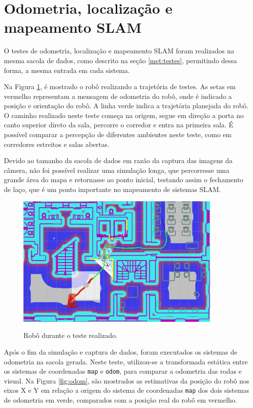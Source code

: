 \documentclass[repeatfields,xlists,xpacks,oneside,yearsonly]{ufrgscca}
\begin{document}
\section{Odometria, localização e mapeamento SLAM}

O testes de odometria, localização e mapeamento SLAM foram realizados na mesma
sacola de dados, como descrito na seção \ref{met:testes}, 
permitindo dessa forma, a mesma entrada em cada sistema.

Na Figura \ref{fig:base_bag}, é mostrado o robô realizando a trajetória
de testes. As setas em vermelho representam a mensagem de odometria do 
robô, onde é indicado a posição e orientação do robô. A linha verde indica 
a trajetória planejada do robô.
O caminho realizado neste teste começa na origem, segue em direção a porta 
no canto superior direto da sala, percorre o corredor e entra na primeira
sala. 
É possível comparar a percepção de diferentes ambientes neste teste, como
em corredores estreitos e salas abertas. 

Devido ao tamanho da sacola de dados em razão da captura das imagens
da câmera, não foi possível realizar uma simulação longa, que percorresse
uma grande área do mapa e retornasse ao ponto inicial, testando assim o 
fechamento de laço, que é um ponto importante no mapeamento de sistemas
SLAM.

\begin{figure}[h]
    {
        \centering
        \caption{Robô durante o teste realizado.}
        \label{fig:base_bag}
        \includegraphics[width=0.9\textwidth]{base_bag_sim_zoom.png}\\
    }
\end{figure}

Após o fim da simulação e captura de dados, foram executados os
sistemas de odometria na sacola gerada.
Neste teste, utilizou-se a transformada estática entre os sistemas
de coordenadas \texttt{map} e \texttt{odom}, para comparar a odometria
das rodas e visual.
Na Figura \ref{fig:odom}, são mostrados as estimativas da posição do robô
nos eixos X e Y em relação a origem do sistema de coordenadas \texttt{map}
dos dois sistemas de odometria em verde, comparados com a posição real do 
robô em vermelho.
\end{document}
